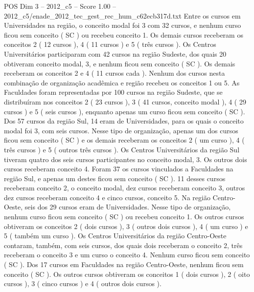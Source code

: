 \begin{textsample}{POS Dim 3 – 2012\_c5 – Score 1.00 – 2012\_c5/enade\_2012\_tec\_gest\_rec\_hum\_c62ecb317d.txt}
Entre os cursos em Universidades na região, o conceito modal foi 3 com 32 cursos, e nenhum curso ficou sem conceito ( SC ) ou recebeu conceito 1.
Os demais cursos receberam os conceitos 2 ( 12 cursos ), 4 ( 11 cursos ) e 5 ( três cursos ).
Os Centros Universitários participaram com 42 cursos na região Sudeste, dos quais 20 obtiveram conceito modal, 3, e nenhum ficou sem conceito ( SC ).
Os demais receberam os conceitos 2 e 4 ( 11 cursos cada ).
Nenhum dos cursos nesta combinação de organização acadêmica e região recebeu os conceitos 1 ou 5.
As Faculdades foram representadas por 100 cursos na região Sudeste, que se distribuíram nos conceitos 2 ( 23 cursos ), 3 ( 41 cursos, conceito modal ), 4 ( 29 cursos ) e 5 ( seis cursos ), enquanto apenas um curso ficou sem conceito ( SC ).
Dos 57 cursos da região Sul, 14 eram de Universidades, para os quais o conceito modal foi 3, com seis cursos.
Nesse tipo de organização, apenas um dos cursos ficou sem conceito ( SC ) e os demais receberam os conceitos 2 ( um curso ), 4 ( três cursos ) e 5 ( outros três cursos ).
Os Centros Universitários da região Sul tiveram quatro dos seis cursos participantes no conceito modal, 3.
Os outros dois cursos receberam conceito 4.
Foram 37 os cursos vinculados a Faculdades na região Sul, e apenas um destes ficou sem conceito ( SC ). 11 desses cursos receberam conceito 2, o conceito modal, dez cursos receberam conceito 3, outros dez cursos receberam conceito 4 e cinco cursos, conceito 5.
Na região Centro-Oeste, seis dos 29 cursos eram de Universidades.
Nesse tipo de organização, nenhum curso ficou sem conceito ( SC ) ou recebeu conceito 1.
Os outros cursos obtiveram os conceitos 2 ( dois cursos ), 3 ( outros dois cursos ), 4 ( um curso ) e 5 ( também um curso ).
Os Centros Universitários da região Centro-Oeste contaram, também, com seis cursos, dos quais dois receberam o conceito 2, três receberam o conceito 3 e um curso o conceito 4.
Nenhum curso ficou sem conceito ( SC ).
Dos 17 cursos em Faculdades na região Centro-Oeste, nenhum ficou sem conceito ( SC ).
Os outros cursos obtiveram os conceitos 1 ( dois cursos ), 2 ( oito cursos ), 3 ( cinco cursos ) e 4 ( outros dois cursos ).

\end{textsample}

